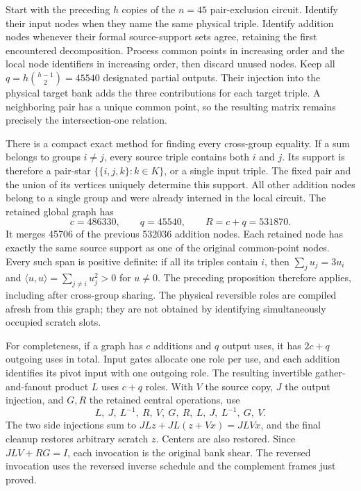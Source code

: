 Start with the preceding $h$ copies of the $n=45$ pair-exclusion circuit.
Identify their input nodes when they name the same physical triple. Identify
addition nodes whenever their formal source-support sets agree, retaining
the first encountered decomposition. Process common points in increasing
order and the local node identifiers in increasing order, then discard unused
nodes. Keep all $q=h\binom{h-1}{2}=45540$ designated partial outputs. Their
injection into the physical target bank adds the three contributions for each
target triple. A neighboring pair has a unique common point, so the resulting
matrix remains precisely the intersection-one relation.

There is a compact exact method for finding every cross-group equality.
If a sum belongs to groups $i\ne j$, every source triple contains both $i$
and $j$. Its support is therefore a pair-star
$\{\{i,j,k\}:k\in K\}$, or a single input triple. The fixed pair and the
union of its vertices uniquely determine this support. All other addition
nodes belong to a single group and were already interned in the local circuit.
The retained global graph has
\[
 c=486330,\qquad q=45540,\qquad R=c+q=531870.
\]
It merges 45706 of the previous 532036 addition nodes. Each retained node has
exactly the same source support as one of the original common-point nodes.
Every such span is positive definite: if all its triples contain $i$, then
$\sum_j u_j=3u_i$ and
$\langle u,u\rangle=\sum_{j\ne i}u_j^2>0$ for $u\ne0$.
The preceding proposition therefore applies, including after cross-group
sharing. The physical reversible roles are compiled afresh from this graph;
they are not obtained by identifying simultaneously occupied scratch slots.

For completeness, if a graph has $c$ additions and $q$ output uses, it has
$2c+q$ outgoing uses in total. Input gates allocate one role per use, and each
addition identifies its pivot input with one outgoing role. The resulting
invertible gather-and-fanout product $L$ uses $c+q$ roles. With $V$ the source
copy, $J$ the output injection, and $G,R$ the retained central operations, use
\[
 L,\ J,\ L^{-1},\ R,\ V,\ G,\ R,\ L,\ J,\ L^{-1},\ G,\ V.
\]
The two side injections sum to $JLz+JL(z+Vx)=JLVx$, and the final cleanup
restores arbitrary scratch $z$. Centers are also restored. Since $JLV+RG=I$,
each invocation is the original bank shear. The reversed invocation uses the
reversed inverse schedule and the complement frames just proved.

